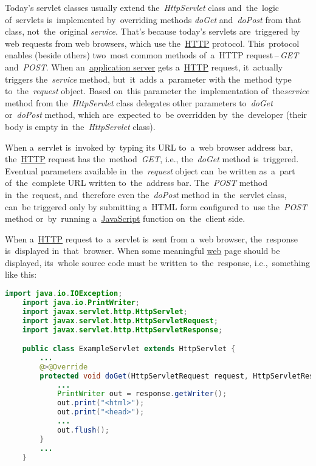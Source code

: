 \label{servicedopostdoget}
 Today's servlet classes usually extend the~\textit{HttpServlet} class and~the~logic of~servlets is~implemented by~overriding methods \textit{doGet} and~\textit{doPost} from that class, not~the~original \textit{service}.
That's because today's servlets are~triggered by web requests from web browsers, which use the~\hyperref[http]{HTTP} protocol.
This~protocol enables (beside others) two~most common methods of~a~HTTP request\,--\,\textit{GET} and~\textit{POST}.
When an~\hyperref[applicationserver]{application server} gets a~\hyperref[http]{HTTP} request, it~actually triggers the~\textit{service} method, but~it~adds a~parameter with the~method type to~the~\textit{request} object.
Based on~this parameter the~implementation of~the\textit{service} method from the~\textit{HttpServlet} class delegates other parameters to~\textit{doGet} or~\textit{doPost} method, which are~expected to~be overridden by~the~developer (their body is empty in~the~\textit{HttpServlet} class).

When a~servlet is~invoked by~typing its URL to~a~web browser address bar, the~\hyperref[http]{HTTP} request has the~method~\textit{GET}, i.e., the~\textit{doGet} method is~triggered.
Eventual parameters available in~the~\textit{request} object can~be written as~a~part of~the~complete URL written to~the~address bar.
The~\textit{POST} method in~the~request, and~therefore even the~\textit{doPost} method in~the~servlet class, can~be triggered only by submitting a~HTML form configured to~use the~\textit{POST} method or~by~running a~\hyperref[javascript]{JavaScript} function on~the~client side.

\label{jsp}
When a~\hyperref[http]{HTTP} request to~a~servlet is~sent from a~web browser, the~response is~displayed in~that~browser.
When some meaningful \hyperref[internetweb]{web} page should be displayed, its~whole source code must be written to~the~response, i.e.,~something like this:

\begin{lstlisting}[language=Java]
    import java.io.IOException;
    import java.io.PrintWriter;
    import javax.servlet.http.HttpServlet;
    import javax.servlet.http.HttpServletRequest;
    import javax.servlet.http.HttpServletResponse;

    public class ExampleServlet extends HttpServlet {
        ...
        @>@Override
        protected void doGet(HttpServletRequest request, HttpServletResponse response) throws IOException {
            ...
            PrintWriter out = response.getWriter();
            out.print("<html>");
            out.print("<head>");
            ...
            out.flush();
        }
        ...
    }
\end{lstlisting}

